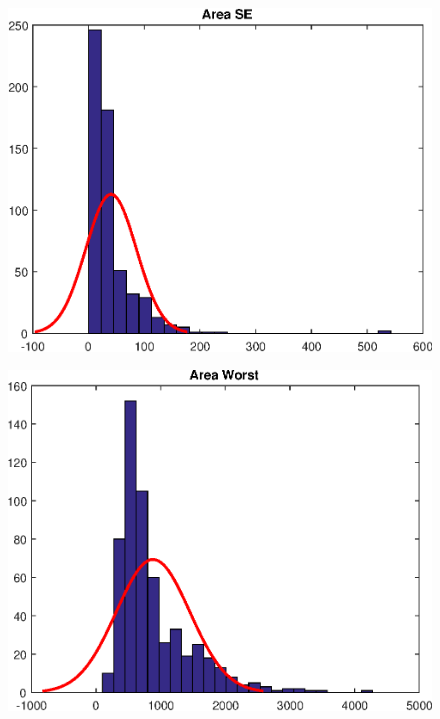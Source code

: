 \documentclass[11pt,a4paper]{article}
\numberwithin{equation}{section}
\begin{document}
\begin{itemize}
\begin{figure}[H]
\centering
\begin{minipage}{.4\textwidth}
  \centering
  \includegraphics[width=\linewidth]{./img/area_se}
  \label{fig:test1}
\end{minipage}%
\begin{minipage}{.4\textwidth}
  \centering
  \includegraphics[width=\linewidth]{./img/area_worst}
  \label{fig:test2}
\end{minipage}
\end{figure}


\end{itemize}
\end{document}
